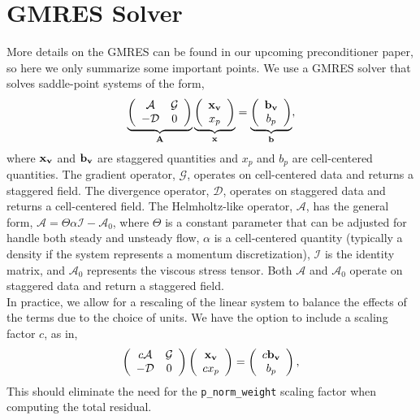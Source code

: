 \documentclass[final]{siamltex}
\def\Ab {{\bf A}}
\def\bb {{\bf b}}
\def\vb {{\bf v}}
\def\xb {{\bf x}}
\begin{document}
\section{GMRES Solver}

More details on the GMRES can be found in our upcoming preconditioner paper,
so here we only summarize some important points.
We use a GMRES solver that solves saddle-point systems of the form,
\begin{equation}
\underbrace{
\left(\begin{array}{cc}
\mathcal{A} & \mathcal{G} \\
-\mathcal{D} & 0
\end{array}\right)
}_{\Ab}
\underbrace{
\left(\begin{array}{c}
\xb_{\vb} \\
x_p
\end{array}\right)
}_{\xb}
=
\underbrace{
\left(\begin{array}{c}
\bb_{\vb}\\
b_p
\end{array}\right)}_{\bb},
\end{equation}
where $\xb_\vb$ and $\bb_\vb$ are staggered quantities and $x_p$ and $b_p$ are
cell-centered quantities.  The gradient operator, $\mathcal{G}$, operates on
cell-centered data and returns a staggered field.  The divergence operator, 
$\mathcal{D}$, operates on staggered data and returns a cell-centered field.  
The Helmholtz-like operator, $\mathcal{A}$, has the general form,
$\mathcal{A} = \Theta\alpha\mathcal{I} - \mathcal{A}_0$, where
$\Theta$ is a constant parameter that can be adjusted for handle both steady and unsteady flow,
$\alpha$ is a cell-centered quantity (typically a density if the system represents a momentum discretization),
$\mathcal{I}$ is the identity matrix, 
and $\mathcal{A}_0$ represents the viscous stress tensor.
Both $\mathcal{A}$ and $\mathcal{A}_0$ operate on staggered data and return
a staggered field.\\

In practice, we allow for a rescaling of the linear system to balance the effects of the terms
due to the choice of units.  We have the option to include a scaling factor $c$, as in,
\begin{equation}
\left(\begin{array}{cc}
c\mathcal{A} & \mathcal{G} \\
-\mathcal{D} & 0
\end{array}\right)
\left(\begin{array}{c}
\xb_{\vb} \\
cx_p
\end{array}\right)
=
\left(\begin{array}{c}
c\bb_{\vb}\\
b_p
\end{array}\right),
\end{equation}
This should eliminate the need for the {\tt p\_norm\_weight} scaling factor
when computing the total residual.\\
\end{document}
